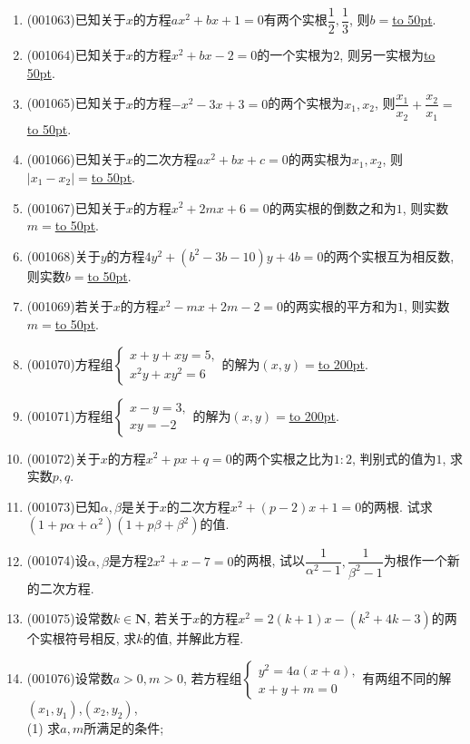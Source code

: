 \documentclass[10pt,a4paper]{article}
\newcommand{\blank}[1]{\underline{\hbox to #1pt{}}}
\begin{document}
\begin{enumerate}[1.]
\item {\tiny (001063)}已知关于$x$的方程$ax^2+bx+1=0$有两个实根$\dfrac{1}{2}, \dfrac{1}{3}$, 则$b=$\blank{50}.
\item {\tiny (001064)}已知关于$x$的方程$x^2+bx-2=0$的一个实根为$2$, 则另一实根为\blank{50}.
\item {\tiny (001065)}已知关于$x$的方程$-x^2-3x+3=0$的两个实根为$x_1,x_2$, 则$\dfrac{x_1}{x_2}+\dfrac{x_2}{x_1}=$\blank{50}.
\item {\tiny (001066)}已知关于$x$的二次方程$ax^2+bx+c=0$的两实根为$x_1,x_2$, 则$|x_1-x_2|=$\blank{50}.
\item {\tiny (001067)}已知关于$x$的方程$x^2+2mx+6=0$的两实根的倒数之和为$1$, 则实数$m=$\blank{50}.
\item {\tiny (001068)}关于$y$的方程$4y^2+(b^2-3b-10)y+4b=0$的两个实根互为相反数, 则实数$b=$\blank{50}.
\item {\tiny (001069)}若关于$x$的方程$x^2-mx+2m-2=0$的两实根的平方和为$1$, 则实数$m=$\blank{50}.
\item {\tiny (001070)}方程组$\left\{
\begin{array}{l}
x+y+xy=5,\\
x^2y+xy^2=6
\end{array}
\right.$的解为$(x,y)=$\blank{200}.
\item {\tiny (001071)}方程组$\left\{
\begin{array}{l}
x-y=3,\\
xy=-2
\end{array}
\right.$的解为$(x,y)=$\blank{200}.
\item {\tiny (001072)}关于$x$的方程$x^2+px+q=0$的两个实根之比为$1:2$, 判别式的值为$1$, 求实数$p,q$.
\item {\tiny (001073)}已知$\alpha,\beta$是关于$x$的二次方程$x^2+(p-2)x+1=0$的两根. 试求$(1+p\alpha+\alpha^2)(1+p\beta+\beta^2)$的值.
\item {\tiny (001074)}设$\alpha,\beta$是方程$2x^2+x-7=0$的两根, 试以$\dfrac{1}{\alpha^2-1},\dfrac{1}{\beta^2-1}$为根作一个新的二次方程.
\item {\tiny (001075)}设常数$k\in\mathbf{N}$, 若关于$x$的方程$x^2=2(k+1)x-(k^2+4k-3)$的两个实根符号相反, 求$k$的值,
并解此方程.
\item {\tiny (001076)}设常数$a>0,m>0$, 若方程组$\left\{
\begin{array}{l}
y^2=4a(x+a),\\
x+y+m=0
\end{array}
\right.$有两组不同的解$(x_1,y_1)$,$(x_2,y_2)$,\\ 
(1) 求$a,m$所满足的条件;\\ 

\end{enumerate}
\end{document}
